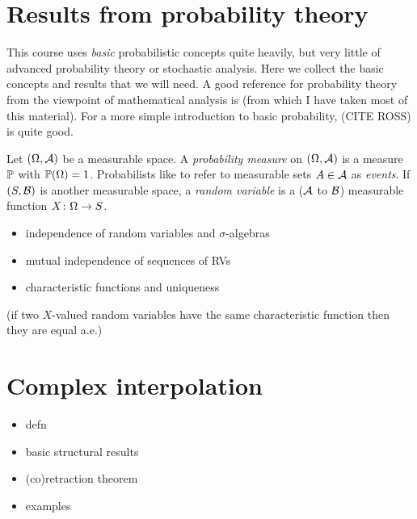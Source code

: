 \section{Results from probability theory}\label{sec:probability}

This course uses \emph{basic} probabilistic concepts quite heavily, but very little of advanced probability theory or stochastic analysis.
Here we collect the basic concepts and results that we will need.
A good reference for probability theory from the viewpoint of mathematical analysis is \cite{rD04} (from which I have taken most of this material).
For a more simple introduction to basic probability, (CITE ROSS) is quite good.

Let $(\Omega,\mc{A})$ be a measurable space.
A \emph{probability measure} on $(\Omega,\mc{A})$ is a measure $\P$ with $\P(\Omega) = 1$.
Probabilists like to refer to measurable sets $A \in \mc{A}$ as \emph{events}.
If $(S,\mc{B})$ is another measurable space, a \emph{random variable} is a ($\mc{A}$ to $\mc{B}$) measurable function $\map{X}{\Omega}{S}$.


\begin{itemize}
\item independence of random variables and $\sigma$-algebras
\item mutual independence of sequences of RVs
\item characteristic functions and uniqueness
\end{itemize}

\begin{thm}\label{thm:characteristic-function-uniqueness}
  (if two $X$-valued random variables have the same characteristic function then they are equal a.e.)
\end{thm}

\section{Complex interpolation}

\begin{itemize}
\item defn
\item basic structural results
\item (co)retraction theorem
\item examples 
\end{itemize}


